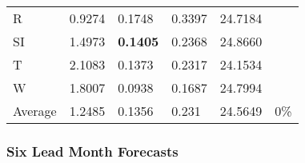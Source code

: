\documentclass[11pt, a4paper]{article}
\begin{document}
\begin{table}[H]
\begin{tabular}{llllll}
R                                & 0.9274                            & 0.1748                            & 0.3397                               & 24.7184                                     &                                   \\
SI                        & 1.4973                            & \textbf{0.1405}                   & 0.2368                               & 24.8660                                     &                                   \\
T                              & 2.1083                            & 0.1373                            & 0.2317                               & 24.1534                                     &                                   \\
W                             & 1.8007                            & 0.0938                            & 0.1687                               & 24.7994                                     &                                   \\ \hline
Average                               & 1.2485                            & 0.1356                            & 0.231                                & 24.5649                                     & 0\%
\end{tabular}
\end{table}

\subsubsection{Six Lead Month Forecasts}\label{apd:six}
\end{document}
